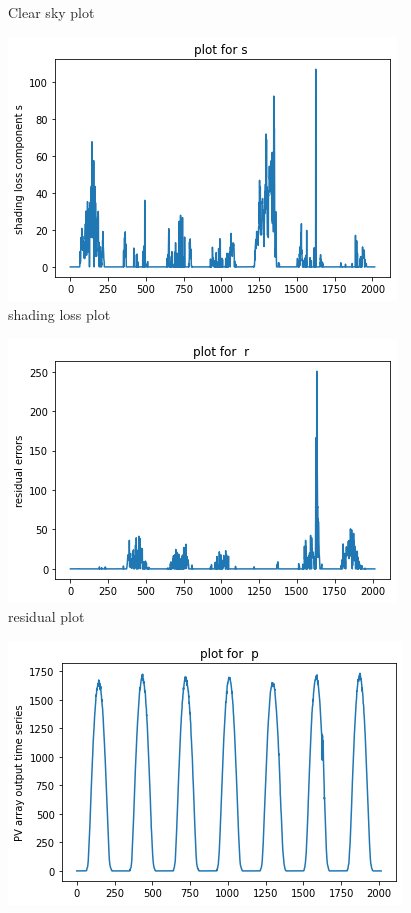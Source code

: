 \documentclass[journal,12pt,twocolumn]{IEEEtran}
\begin{document}
\begin{enumerate}
\begin{figure}[H]
    \caption{Clear sky plot}
    \label{}
\end{figure}
\begin{figure}[H]
	\centering
    \includegraphics[width=\columnwidth]{s.png}
    \caption{shading loss plot}
    \label{}
\end{figure}
\begin{figure}[H]
	\centering
    \includegraphics[width=\columnwidth]{r.png}
    \caption{residual plot}
    \label{}
\end{figure}
\begin{figure}[H]
	\centering
    \includegraphics[width=\columnwidth]{p.png}

\end{figure}
\end{enumerate}
\end{document}
